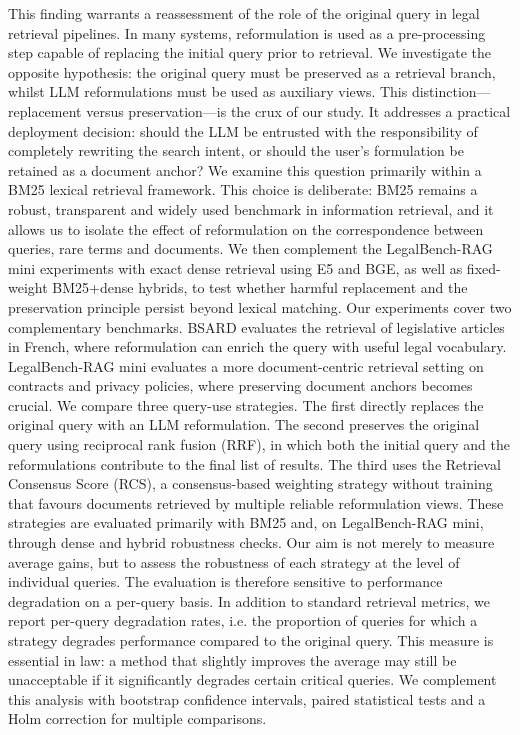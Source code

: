 \documentclass[a4paper,fleqn]{cas-dc}
\begin{document}
This finding warrants a reassessment of the role of the original query in legal retrieval pipelines. In many systems, reformulation is used as a pre-processing step capable of replacing the initial query prior to retrieval. We investigate the opposite hypothesis: the original query must be preserved as a retrieval branch, whilst LLM reformulations must be used as auxiliary views. This distinction—replacement versus preservation—is the crux of our study. It addresses a practical deployment decision: should the LLM be entrusted with the responsibility of completely rewriting the search intent, or should the user’s formulation be retained as a document anchor?
We examine this question primarily within a BM25 lexical retrieval framework. This choice is deliberate: BM25 remains a robust, transparent and widely used benchmark in information retrieval, and it allows us to isolate the effect of reformulation on the correspondence between queries, rare terms and documents. We then complement the LegalBench-RAG mini experiments with exact dense retrieval using E5 and BGE, as well as fixed-weight BM25+dense hybrids, to test whether harmful replacement and the preservation principle persist beyond lexical matching. Our experiments cover two complementary benchmarks. BSARD evaluates the retrieval of legislative articles in French, where reformulation can enrich the query with useful legal vocabulary. LegalBench-RAG mini evaluates a more document-centric retrieval setting on contracts and privacy policies, where preserving document anchors becomes crucial.
We compare three query-use strategies. The first directly replaces the original query with an LLM reformulation. The second preserves the original query using reciprocal rank fusion (RRF), in which both the initial query and the reformulations contribute to the final list of results. The third uses the Retrieval Consensus Score (RCS), a consensus-based weighting strategy without training that favours documents retrieved by multiple reliable reformulation views. These strategies are evaluated primarily with BM25 and, on LegalBench-RAG mini, through dense and hybrid robustness checks. Our aim is not merely to measure average gains, but to assess the robustness of each strategy at the level of individual queries.
The evaluation is therefore sensitive to performance degradation on a per-query basis. In addition to standard retrieval metrics, we report per-query degradation rates, i.e. the proportion of queries for which a strategy degrades performance compared to the original query. This measure is essential in law: a method that slightly improves the average may still be unacceptable if it significantly degrades certain critical queries. We complement this analysis with bootstrap confidence intervals, paired statistical tests and a Holm correction for multiple comparisons.
\end{document}

